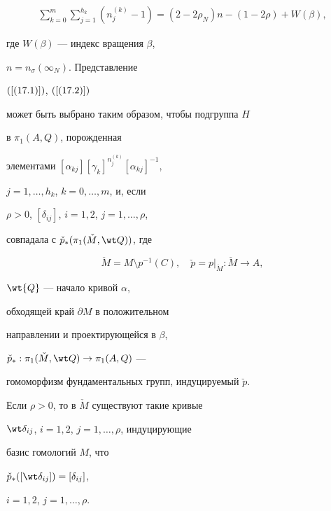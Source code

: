 \begin{thm}
\begin{gather}
\sum^m_{k=0}\sum^{h_k}_{j=1}


(n^{(k)}_j-1)=(2-2\rho_N)n-(1-2\rho)+W(\beta),


\label{(17.4)}


\end{gather}


где $W(\beta)$ --- индекс вращения $\beta$,


$n=n_\sigma(\infty_N)$. Представление


$(\ref{(17.1)})$, $(\ref{(17.2)})$


может быть выбрано таким образом, чтобы подгруппа $H$


в $\pi_1(A,Q)$, порожденная


элементами $[\alpha_{kj}][\gamma_k]^{n_j^{(k)}}


[\alpha_{kj}]^{-1}$,


$j=1,\dotsc,h_k$, $k=0,\dotsc,m$, и, если 


$\rho>0$, $[\delta_{ij}]$, $i=1,2$, $j=1,\dotsc,\rho$,


совпадала с $\check p_{\ast}


(\pi_1(\check M,\wt Q))$, где


\begin{equation}


\check {M}=M\setminus p^{-1}(C),


\quad \check p=p|_{\check M}:\check M\to A,


\label{(17.5)}


\end{equation}


$\wt{Q}$ --- начало кривой $\alpha$,


обходящей край $\partial M$ в положительном


направлении и проектирующейся в $\beta$,


$\check p_{\ast}:\pi_1(\check M,\wt Q)\to\pi_1 (A,Q)$ ---


гомоморфизм фундаментальных групп, индуцируемый $\check p$.


Если $\rho>$0, то в $\check M$ существуют такие кривые


$\wt \delta_{ij}$, $i=1,2$, $j=1,\dotsc,\rho$, индуцирующие 


базис гомологий $M$, что


$\check p_{\ast}([\wt\delta_{ij}])=[\delta_{ij}]$,


$i=1,2$, $j=1,\dotsc,\rho $.


\end{thm}





